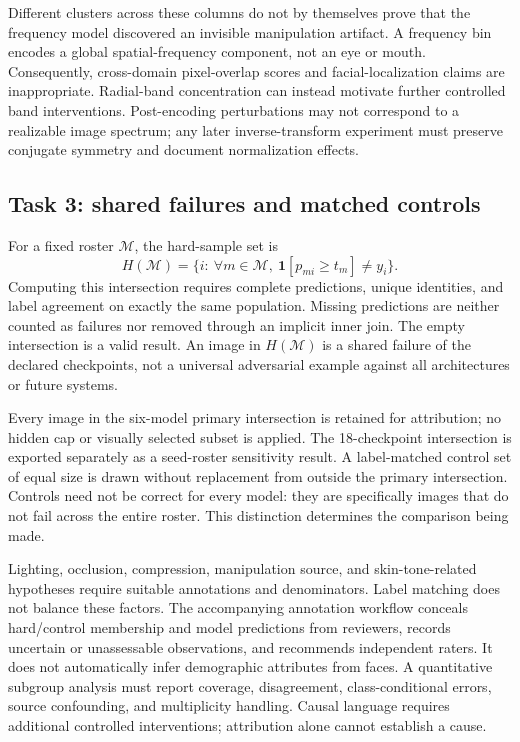 \documentclass[conference,10pt,letterpaper]{IEEEtran}
\newcommand{\ind}{\mathbf{1}}
\begin{document}
Different clusters across these columns do not by themselves prove that the frequency model discovered an invisible manipulation artifact. A frequency bin encodes a global spatial-frequency component, not an eye or mouth. Consequently, cross-domain pixel-overlap scores and facial-localization claims are inappropriate. Radial-band concentration can instead motivate further controlled band interventions. Post-encoding perturbations may not correspond to a realizable image spectrum; any later inverse-transform experiment must preserve conjugate symmetry and document normalization effects.

\subsection{Task 3: shared failures and matched controls}
For a fixed roster $\mathcal M$, the hard-sample set is
\begin{equation}
 H(\mathcal M)=\{i:\ \forall m\in\mathcal M,\ \ind[p_{mi}\geq t_m]\neq y_i\}.
\end{equation}
Computing this intersection requires complete predictions, unique identities, and label agreement on exactly the same population. Missing predictions are neither counted as failures nor removed through an implicit inner join. The empty intersection is a valid result. An image in $H(\mathcal M)$ is a shared failure of the declared checkpoints, not a universal adversarial example against all architectures or future systems.

Every image in the six-model primary intersection is retained for attribution; no hidden cap or visually selected subset is applied. The 18-checkpoint intersection is exported separately as a seed-roster sensitivity result. A label-matched control set of equal size is drawn without replacement from outside the primary intersection. Controls need not be correct for every model: they are specifically images that do not fail across the entire roster. This distinction determines the comparison being made.

Lighting, occlusion, compression, manipulation source, and skin-tone-related hypotheses require suitable annotations and denominators. Label matching does not balance these factors. The accompanying annotation workflow conceals hard/control membership and model predictions from reviewers, records uncertain or unassessable observations, and recommends independent raters. It does not automatically infer demographic attributes from faces. A quantitative subgroup analysis must report coverage, disagreement, class-conditional errors, source confounding, and multiplicity handling. Causal language requires additional controlled interventions; attribution alone cannot establish a cause.
\end{document}
